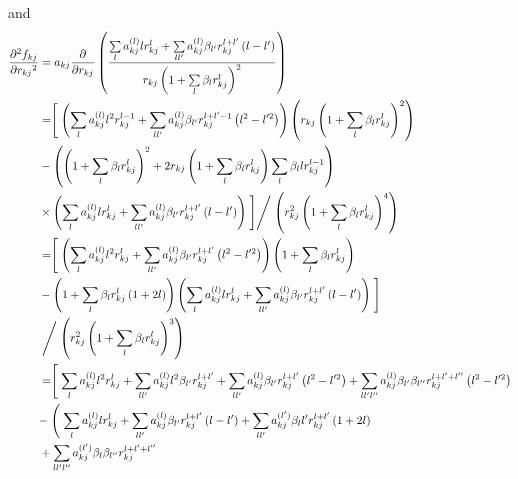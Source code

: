     and
        \newcommand{\akjl}{a^{(l)}_{kj}}
        \newcommand{\akjll}{a^{(l')}_{kj}}
        \begin{align}
            \prd{r_{kj}}[f_{kj}][2] &= a_{kj}
            \prd{r_{kj}}\left(\frac{\sum\limits_l a^{(l)}_{kj}lr^l_{kj} +
            \sum\limits_{ll'}a^{(l)}_{kj}\beta_{l'}r^{l+l'}_{kj}
            \left(l-l'\right)}{r_{kj}\left(1 +
            \sum\limits_l\beta_lr^l_{kj}\right)^2}\right) \nonumber \\
            &= \Biggm[\left(\sumll{l}\akjl l^2r^{l-1}_{kj} +
            \sumll{ll'}\akjl\beta_{l'}r^{l+l'-1}_{kj}\left(l^2-l'^2\right)\right)
            \left(r_{kj} \left(1 + \sum\limits_l\beta_lr^l_{kj}\right)^2\right)
            \nonumber \\ &-\left(\left(1 +
            \sum\limits_l\beta_lr^l_{kj}\right)^2 + 2r_{kj}\left(1 +
            \sumll{l}\beta_lr^l_{kj}\right)\sumll{l}\beta_llr^{l-1}_{kj}\right)
            \nonumber \\ &\times\left(\sumll{l}\akjl lr^l_{kj} +
            \sumll{ll'}\akjl\beta_{l'}r^{l+l'}_{kj}\left(l-l'\right)\right)
            \Biggm] \Biggm/ \left(r^2_{kj} \left(1 +
            \sum\limits_l\beta_lr^l_{kj}\right)^4\right) \nonumber \\
            &= \Biggm[\left(\sumll{l}\akjl l^2r^l_{kj} +
            \sumll{ll'}\akjl\beta_{l'}r^{l+l'}_{kj}\left(l^2-l'^2\right)\right)
            \left(1 + \sumll{l}\beta_lr^l_{kj}\right) \nonumber \\ &-\left(1 +
            \sumll{l}\beta_lr^l_{kj} \left(1+2l\right) \right)
            \left(\sum\limits_l\akjl lr^l_{kj} +
            \sumll{ll'}\akjl\beta_{l'}r^{l+l'}_{kj}\left(l-l'\right)\right)
            \Biggm] \nonumber \\ &\Biggm/ \left(r^2_{kj} \left(1 +
            \sum\limits_l\beta_lr^l_{kj}\right)^3\right) \nonumber \\
            &= \Biggm[\sumll{l}\akjl l^2r^l_{kj} + \sumll{ll'}\akjl
            l^2\beta_{l'}r^{l+l'}_{kj} +
            \sumll{ll'}\akjl\beta_{l'}r^{l+l'}_{kj}\left(l^2-l'^2\right) +
            \sumll{ll'l''}\akjl\beta_{l'}\beta_{l''}r^{l+l'+l''}_{kj}
            \left(l^2-l'^2\right) \nonumber \\ &- \Biggm(\sumll{l}\akjl
            lr^l_{kj} +
            \sumll{ll'}\akjl\beta_{l'}r^{l+l'}_{kj}\left(l-l'\right) +
            \sumll{ll'}\akjll\beta_ll'r^{l+l'}_{kj}\left(1+2l\right) \nonumber
            \\ &+ \sumll{ll'l''}\akjll\beta_l\beta_{l''}r^{l+l'+l''}_{kj}

\end{align}
